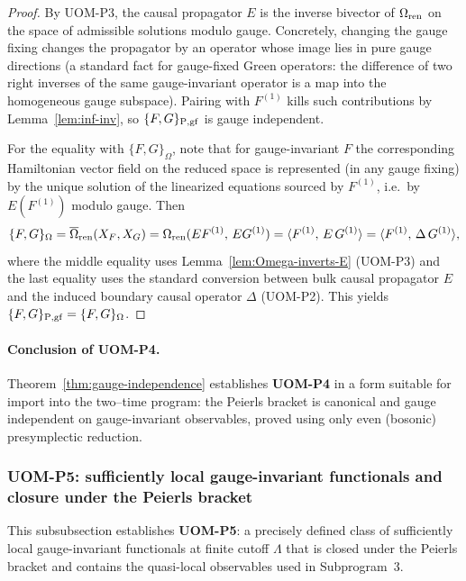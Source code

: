 \documentclass[10pt]{article}
\theoremstyle{definition}
\theoremstyle{plain}
\begin{document}
\begin{proof}
By UOM-P3, the causal propagator $E$ is the inverse bivector of $\Omega_{\rm ren}$ on the space of admissible solutions modulo gauge.
Concretely, changing the gauge fixing changes the propagator by an operator whose image lies in pure gauge directions (a standard fact for
gauge-fixed Green operators: the difference of two right inverses of the same gauge-invariant operator is a map into the homogeneous gauge
subspace).  Pairing with $F^{(1)}$ kills such contributions by Lemma~\ref{lem:inf-inv}, so $\{F,G\}_{{\rm P},{\rm gf}}$ is gauge independent.

For the equality with $\{F,G\}_\Omega$, note that for gauge-invariant $F$ the corresponding Hamiltonian vector field on the reduced space is
represented (in any gauge fixing) by the unique solution of the linearized equations sourced by $F^{(1)}$, i.e.\ by $E(F^{(1)})$ modulo gauge.
Then
\[
\{F,G\}_\Omega=\overline\Omega_{\rm ren}(X_F,X_G)
=\Omega_{\rm ren}(E F^{(1)},\,E G^{(1)})
=\langle F^{(1)},\,E\,G^{(1)}\rangle
=\langle F^{(1)},\,\Delta\,G^{(1)}\rangle,
\]
where the middle equality uses Lemma~\ref{lem:Omega-inverts-E} (UOM-P3) and the last equality uses the standard conversion between bulk causal
propagator $E$ and the induced boundary causal operator $\Delta$ (UOM-P2).  This yields $\{F,G\}_{{\rm P},{\rm gf}}=\{F,G\}_\Omega$.
\end{proof}

\paragraph{Conclusion of UOM-P4.}
Theorem~\ref{thm:gauge-independence} establishes \textbf{UOM-P4} in a form suitable for import into the two--time program:
the Peierls bracket is canonical and gauge independent on gauge-invariant observables, proved using only even (bosonic) presymplectic reduction.

\subsubsection{UOM-P5: sufficiently local gauge-invariant functionals and closure under the Peierls bracket}
\label{subsubsec:uom-P5}

This subsubsection establishes \textbf{UOM-P5}: a precisely defined class of sufficiently local gauge-invariant functionals at finite cutoff
$\Lambda$ that is closed under the Peierls bracket and contains the quasi-local observables used in Subprogram~3.
\end{document}
